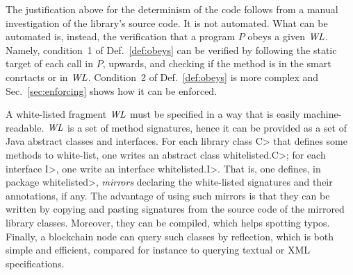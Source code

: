 The justification above for the determinism of the code follows from
a manual investigation of the library's source code. It is not automated. What can
be automated is, instead, the verification that a program $P$ obeys a given $\mathit{WL}$.
Namely, condition~1 of Def.~\ref{def:obeys} can be verified
by following the static target of each call in $P$, upwards,
and checking if the method is in the smart conrtacts or in $\mathit{WL}$.
Condition~2 of Def.~\ref{def:obeys} is more complex and
Sec.~\ref{sec:enforcing} shows how it can be enforced.

A white-listed fragment $\mathit{WL}$ must be specified in a way that is easily machine-readable.
$\mathit{WL}$ is a set of method signatures, hence it can be provided
as a set of Java abstract classes and interfaces. For each library class \<C> that defines some
methods to white-list, one writes an abstract class \<whitelisted.C>;
for each interface \<I>, one write an interface \<whitelisted.I>. That is, one defines,
in package \<whitelisted>, \emph{mirrors} declaring the white-listed signatures and
their annotations, if any.
The advantage of using such mirrors is that they can be written by copying and pasting
signatures from the source code of the mirrored library classes. Moreover, they can be compiled,
which helps spotting typos. Finally, a blockchain node can query such classes by reflection,
which is both simple and efficient, compared for instance to querying textual or XML
specifications.

